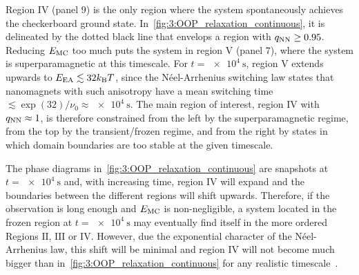 
Region $\mathrm{IV}$ (panel 9) is the only region where the system spontaneously achieves the checkerboard ground state.
In~\cref{fig:3:OOP_relaxation_continuous}, it is delineated by the dotted black line that envelops a region with $q_\mathrm{NN} \geq 0.95$.
Reducing $E_\mathrm{MC}$ too much puts the system in region $\mathrm{V}$ (panel 7), where the system is superparamagnetic at this timescale.
For $t = \SI{e4}{\second}$, region $\mathrm{V}$ extends upwards to $\EEA \lesssim 32 \kBT$, since the N\'eel-Arrhenius switching law states that nanomagnets with such anisotropy have a mean switching time $\lesssim \exp(32)/\nu_0 \approx \SI{e4}{\second}$.
The main region of interest, region $\mathrm{IV}$ with $q_\mathrm{NN} \approx 1$, is therefore constrained from the left by the superparamagnetic regime, from the top by the transient/frozen regime, and from the right by states in which domain boundaries are too stable at the given timescale. \par
The phase diagrams in~\cref{fig:3:OOP_relaxation_continuous} are snapshots at $t = \SI{e4}{\second}$ and, with increasing time, region $\mathrm{IV}$ will expand and the boundaries between the different regions will shift upwards.
Therefore, if the observation is long enough and $E_\mathrm{MC}$ is non-negligible, a system located in the frozen region at $t = \SI{e4}{\second}$ may eventually find itself in the more ordered Regions $\mathrm{II}$, $\mathrm{III}$ or $\mathrm{IV}$.
However, due the exponential character of the N\'eel-Arrhenius law, this shift will be minimal and region $\mathrm{IV}$ will not become much bigger than in~\cref{fig:3:OOP_relaxation_continuous} for any realistic timescale~\cite{KUR-24}.

